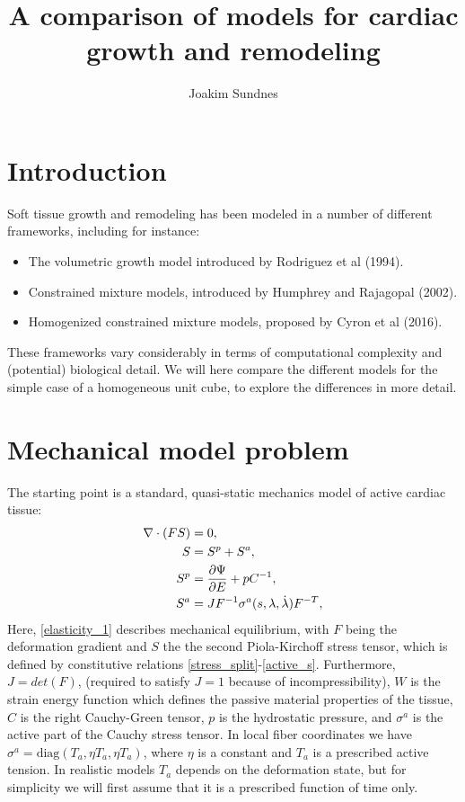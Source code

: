 \documentclass[twoside,12pt,a4paper]{article}
\title{A comparison of models for cardiac growth and remodeling}
\author{Joakim Sundnes}
\begin{document}
\maketitle

\section{Introduction}
Soft tissue growth and remodeling has been modeled in a number of different frameworks,
including for instance:
\begin{itemize}
  \item The volumetric growth model introduced by Rodriguez et al (1994).
  \item Constrained mixture models, introduced by Humphrey and Rajagopal (2002).
  \item Homogenized constrained mixture models, proposed by Cyron et al (2016).
\end{itemize}
These frameworks vary considerably in terms of computational complexity and (potential) 
biological detail. We will here compare the different models for the simple case of a 
homogeneous unit cube, to explore the differences in more detail.


\section{Mechanical model problem}
The starting point is a standard, quasi-static mechanics model of active cardiac tissue:
\begin{align}
\nabla\cdot(FS) &= 0,  \label{elasticity_1} \\
S &= S^p + S^a,  \label{stress_split} \\
S^p &= {\partial\Psi\over\partial E}+pC^{-1}, \\
S^a &= J F^{-1}\sigma^a(s,\lambda,\dot{\lambda})F^{-T}, \label{active_s}
\end{align}
Here, \eqref{elasticity_1} describes mechanical equilibrium, 
with $F$ being the deformation gradient and $S$ the the second Piola-Kirchoff
stress tensor, which is defined by constitutive relations \eqref{stress_split}-\eqref{active_s}.
Furthermore, $J=det(F)$, (required to satisfy $J=1$ because of incompressibility), 
$W$ is the strain energy function which defines the passive material properties of the 
tissue, $C$ is the right Cauchy-Green tensor, $p$ is the hydrostatic pressure, 
and $\sigma^a$ is the active part of the Cauchy stress tensor. In
local fiber coordinates we have $\sigma^a = \mbox{diag}(T_a,\eta
T_a, \eta T_a)$, where $\eta$ is a constant and $T_a$ is a prescribed active tension. 
In realistic models $T_a$ depends on the deformation state, but for simplicity we will first 
assume that it is a prescribed function of time only. 
\end{document}
